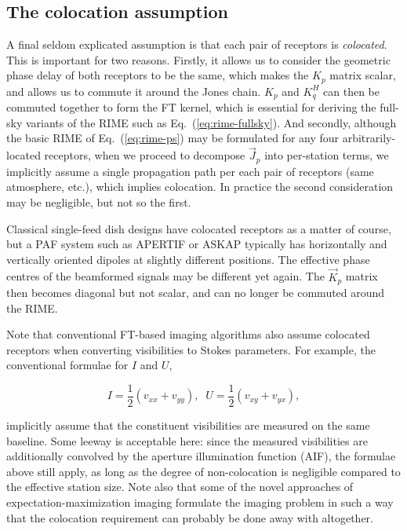 \documentclass[]{aa}
\newcommand{\herm}{H}
\newcommand{\jones}[2]{\vec {#1}_{#2}}
\begin{document}
\subsection{The colocation assumption}

A final seldom explicated assumption is that each pair of receptors is \emph{colocated}. This is important for two reasons. Firstly, it allows us to consider the geometric phase delay of both receptors to be the same, which makes the $K_p$ matrix scalar, and allows us to commute it around the Jones chain. $K_p$ and $K_q^\herm$ can then be commuted together to form the FT kernel, which is essential for deriving the full-sky variants of the RIME such as Eq.~(\ref{eq:rime-fullsky}). And secondly, although the basic RIME of Eq.~(\ref{eq:rime-ps}) may be formulated for any four arbitrarily-located receptors, when we proceed to decompose $\jones{J}{p}$ into per-station terms, we implicitly assume a single propagation path per each pair of receptors (same atmosphere, etc.), which implies colocation. In practice the second consideration may be negligible, but not so the first.

Classical single-feed dish designs have colocated receptors as a matter of course, but a PAF system such as APERTIF \citep{Apertif} or ASKAP \citep{ASKAP} typically has horizontally and vertically oriented dipoles at slightly different positions. The effective phase centres of the beamformed signals may be different yet again. The $\jones{K}{p}$ matrix then becomes diagonal but not scalar, and can no longer be commuted around the RIME. 

Note that conventional FT-based imaging algorithms also assume colocated receptors when converting visibilities to Stokes parameters. For example, the conventional formulae for $I$ and $U$,

\[
I=\frac{1}{2}(v_{xx}+v_{yy}),\;\;U=\frac{1}{2}(v_{xy}+v_{yx}),
\] 

implicitly assume that the constituent visibilities are measured on the same baseline. Some leeway is acceptable here: since the measured visibilities are additionally convolved by the aperture illumination function (AIF), the formulae above still apply, as long as the degree of non-colocation is negligible compared to the effective station size. Note also that some of the novel approaches of expectation-maximization imaging \citep{leshem-em,levanda-leshem-em} formulate the imaging problem in such a way that the colocation requirement can probably be done away with altogether.
\end{document}
